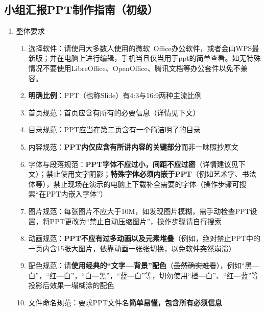 \subsection[小组汇报PPT制作指南（初级）]{小组汇报PPT制作指南（初级）}
\begin{enumerate}
    \item 整体要求
          \begin{enumerate}
              \item 选择软件：请使用大多数人使用的微软\ Office办公软件，或者金山WPS最新版；并在电脑上进行编辑，手机当且仅当用于ppt的简单查看。如无特殊情况不要使用LibreOffice、OpenOffice、腾讯文档等办公套件以免不兼容。
              \item \textbf{明确比例}：PPT（也称Slide）有4:3与16:9两种主流比例\footnotemark
              \item 首页规范：首页应含有所有的必要信息（详情见下文）
              \item 目录规范：PPT应当在第二页含有一个简洁明了的目录
              \item 内容规范：\textbf{PPT内仅应含有所讲内容的关键部分}而非一昧照抄原文
              \item 字体与段落规范：\textbf{PPT字体不应过小，间距不应过密}（详情建议见下文）；禁止使用文字阴影；\textbf{特殊字体必须内嵌于PPT}（例如艺术字、书法体等），禁止现场在演示的电脑上下载补全需要的字体（操作步骤可搜索“在PPT内嵌入字体”）
              \item 图片规范：每张图片不应大于10M\footnotemark，如发现图片模糊，需手动检查PPT设置，将PPT更改为“禁止自动压缩图片”，操作步骤请自行搜索
              \item 动画规范：\textbf{PPT不应有过多动画以及元素堆叠}（例如，绝对禁止PPT中的一页内含15张大图片，依靠动画一张张切换，以免软件突然崩溃）
              \item 配色规范：请\textbf{使用经典的“文字—背景”配色}（\sout{虽然确实难看}），例如“黑—白”，“红—白”，\linebreak[3]“白—黑”，“蓝—白”等，切勿使用“橙—白”、“红—蓝”等投影后效果一塌糊涂的配色\footnotemark
              \item 文件命名规范：要求PPT文件名\textbf{简单易懂，包含所有必须信息}

\end{enumerate}
\end{enumerate}
